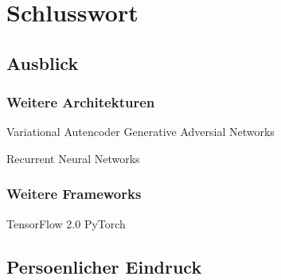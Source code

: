 \chapter*{Schlusswort}

\section*{Ausblick}
\subsection*{Weitere Architekturen}
Variational Autencoder
Generative Adversial Networks

Recurrent Neural Networks

\subsection*{Weitere Frameworks}
TensorFlow 2.0
PyTorch



\section*{Persoenlicher Eindruck}


